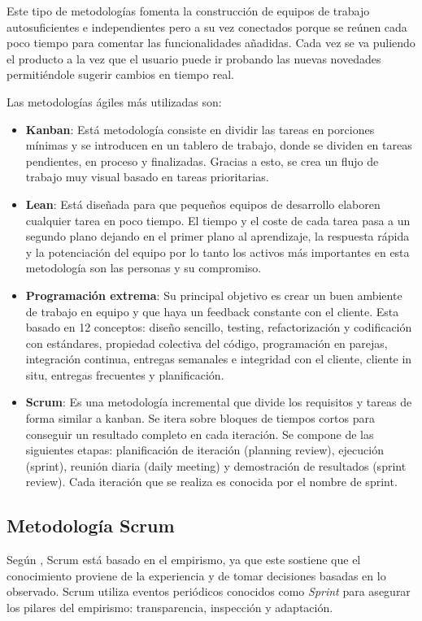 Este tipo de metodologías fomenta la construcción de equipos de trabajo autosuficientes e independientes pero a su vez conectados porque se reúnen cada poco tiempo para comentar las funcionalidades añadidas. Cada vez se va puliendo el producto a la vez que el usuario puede ir probando las nuevas novedades permitiéndole sugerir cambios en tiempo real.

Las metodologías ágiles más utilizadas son:
\begin{itemize}
    \item \textbf{Kanban}: Está metodología consiste en dividir las tareas en porciones mínimas y se introducen en un tablero de trabajo, donde se dividen en tareas pendientes, en proceso y finalizadas. Gracias a esto, se crea un flujo de trabajo muy visual basado en tareas prioritarias.
    \item \textbf{Lean}: Está diseñada para que pequeños equipos de desarrollo elaboren cualquier tarea en poco tiempo. El tiempo y el coste de cada tarea pasa a un segundo plano dejando en el primer plano al aprendizaje, la respuesta rápida y la potenciación del equipo por lo tanto los activos más importantes en esta metodología son las personas y su compromiso.
    \item \textbf{Programación extrema}: Su principal objetivo es crear un buen ambiente de trabajo en equipo y que haya un feedback constante con el cliente. Esta basado en 12 conceptos: diseño sencillo, testing, refactorización y codificación con estándares, propiedad colectiva del código, programación en parejas, integración continua, entregas semanales e integridad con el cliente, cliente in situ, entregas frecuentes y planificación.
    \item \textbf{Scrum}: Es una metodología incremental que divide los requisitos y tareas de forma similar a kanban. Se itera sobre bloques de tiempos cortos para conseguir un resultado completo en cada iteración. Se compone de las siguientes etapas: planificación de iteración (planning review), ejecución (sprint), reunión diaria (daily meeting) y demostración de resultados (sprint review). Cada iteración que se realiza es conocida por el nombre de sprint.
\end{itemize}

\subsection{Metodología Scrum}

Según \textcite{theScrumGuide}, Scrum está basado en el empirismo, ya que este sostiene que el conocimiento proviene de la experiencia y de tomar decisiones basadas en lo observado. Scrum utiliza eventos periódicos conocidos como \textit{Sprint} para asegurar los pilares del empirismo: transparencia, inspección y adaptación.


